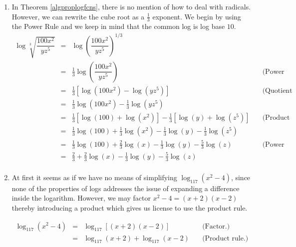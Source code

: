 \begin{example}
\begin{enumerate}
\item In Theorem \ref{algproplogfcns}, there is no mention of how to deal with radicals.  However, we can rewrite the cube root as a $\frac{1}{3}$ exponent.  We begin by using the Power Rule and we keep in mind that the common log is log base $10$. 
\setlength{\extrarowheight}{6pt}
\[ \begin{array}{rclr}

\log \sqrt[3]{\dfrac{100 x^2}{yz^5}} & = & \log \left(\dfrac{100 x^2}{yz^5}\right)^{1/3} & \\ [10pt]
																		& = & \frac{1}{3} \log\left(\dfrac{100 x^2}{yz^5}\right) & \quad\mbox{(Power rule.)} \\ [5pt]
																		& = & \frac{1}{3} \left[ \log\left(100x^2\right) - \log\left(yz^5\right) \right] & \quad\mbox{(Quotient rule.)} \\ 
																		& = & \frac{1}{3}\log\left(100x^2\right) - \frac{1}{3}\log\left(yz^5\right) & \\
																		& = & \frac{1}{3}\left[ \log(100) + \log\left(x^2\right)\right] - \frac{1}{3} \left[ \log(y) + \log\left(z^5\right) \right] & \quad\mbox{(Product rule.)} \\
																		& = & \frac{1}{3} \log(100) + \frac{1}{3} \log\left(x^2\right) - \frac{1}{3} \log(y) - \frac{1}{3} \log\left(z^5\right) \\
																		& = & \frac{1}{3} \log(100) + \frac{2}{3} \log(x) - \frac{1}{3} \log(y) - \frac{5}{3} \log(z) & \quad\mbox{(Power rule.)} \\
																		& = & \frac{2}{3} + \frac{2}{3} \log(x) - \frac{1}{3} \log(y) - \frac{5}{3} \log(z) &  \\

\end{array} \]
\setlength{\extrarowheight}{2pt}

\item  At first it seems as if we have no means of simplifying $\log_{117}\left(x^2-4\right)$, since none of the properties of logs addresses the issue of expanding a difference inside the logarithm.  However, we may factor $x^2 - 4 = (x+2)(x-2)$ thereby introducing a product which gives us license to use the product rule.

\setlength{\extrarowheight}{4pt}
\[ \begin{array}{rclr}

\log_{117}\left(x^2-4\right) & = & \log_{117} \left[(x+2)(x-2)\right] & \quad\mbox{(Factor.)} \\
														 & = & \log_{117}(x+2) + \log_{117}(x-2) & \quad\mbox{(Product rule.)} \\
\end{array}\]
\setlength{\extrarowheight}{2pt}


\end{enumerate}
\end{example}
